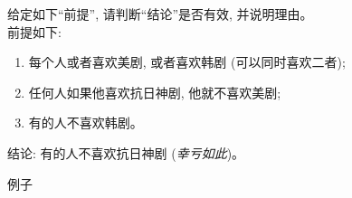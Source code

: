 \begin{frame}{}
  \begin{exampleblock}{}
    给定如下``前提'', 请判断``结论''是否有效, 并说明理由。\\
    前提如下:
    \begin{enumerate}[(1)]
      \item 每个人或者喜欢美剧, 或者喜欢韩剧 (可以同时喜欢二者);
      \item 任何人如果他喜欢抗日神剧, 他就不喜欢美剧;
      \item 有的人不喜欢韩剧。
    \end{enumerate}

    结论: 有的人不喜欢抗日神剧 (\emph{幸亏如此})。
  \end{exampleblock}
\end{frame}

\begin{frame}{}
  例子
\end{frame}
